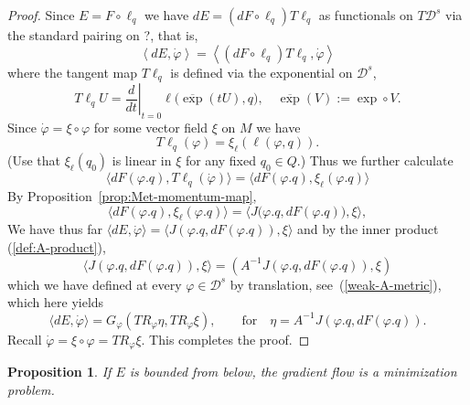 \documentclass[a5paper,10pt,twoside]{article}
\newcommand{\cD}{\ensuremath{\mathcal{D}}}
\theoremstyle{plain}
\newtheorem{prop}[teo]{Proposition}
\theoremstyle{definition}
\theoremstyle{remark}
\begin{document}
\begin{proof}
Since $E=F\circ\ell_q$ we have
 $dE=(dF\circ\ell_q)T\ell_q$ as functionals on $T\cD^s$ via the standard pairing on ?,
that is,
%
\begin{equation}
\left\langle dE,\dot{\varphi}\right\rangle = 
\left\langle \left(dF\circ\ell_q\right)T\ell_q,\dot{\varphi}\right\rangle
\end{equation} 
%
where the tangent map $T\ell_q$ is defined via the exponential on $\cD^s$,
\[
T\ell_q U = \left.\frac{d}{dt}\right|_{t=0}\ell\big(\overline{\exp}(tU),q\big),\quad \overline{\exp}(V):=\exp\circ V.
\]
Since $\dot{\varphi}=\xi\circ\varphi$ for some vector field $\xi$ on $M$ we have
%
\begin{equation}
T\ell_q(\varphi)= \xi_\ell(\ell(\varphi,q)).
\end{equation}
%
 (Use that  $\xi_\ell(q_0)$ is linear in $\xi$ for any fixed $q_0\in Q$.)
Thus we further calculate
%
\begin{equation}
\langle dF(\varphi.q),T\ell_q(\dot{\varphi})\rangle=\langle dF(\varphi.q),\xi_\ell(\varphi.q)\rangle
\end{equation}
%
By Proposition~\ref{prop:Met-momentum-map},
%
\begin{equation}
\langle dF(\varphi.q),\xi_\ell(\varphi.q)\rangle=\langle J\big(\varphi.q, dF(\varphi.q)\big),\xi\rangle,
\end{equation}
%
We have thus far $\langle dE,\dot{\varphi}\rangle=\langle J(\varphi.q,dF(\varphi.q)),\xi\rangle$ and by the inner product (\ref{def:A-product}),
%
\begin{equation}
\langle J(\varphi.q,dF(\varphi.q)),\xi\rangle = (A^{-1}J(\varphi.q,dF(\varphi.q)),\xi)
\end{equation}
%
which we have defined at every $\varphi\in\cD^s$ by translation, see~(\ref{weak-A-metric}), which here yields
%
\begin{equation}
\langle dE,\dot{\varphi}\rangle = G_\varphi(TR_\varphi\eta,TR_\varphi\xi),\qquad\mathrm{for}\quad \eta=A^{-1}J(\varphi.q,dF(\varphi.q)).
\end{equation}
%
Recall $\dot{\varphi}=\xi\circ\varphi=TR_\varphi\xi$. This completes the proof.
\end{proof}


\begin{prop}
If $E$ is bounded from below, the gradient flow is a minimization problem.
\end{prop}
\end{document}
